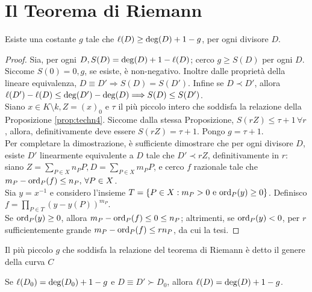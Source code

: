     \section{Il Teorema di Riemann}
        \begin{teorema}[di Riemann]
            Esiste una costante $g$ tale che $\ell(D) \geq \deg(D) + 1 - g$, per 
            ogni divisore $D$.
        \end{teorema}
        \begin{proof}
            Sia, per ogni $D, S(D) = \deg(D) + 1 - \ell(D)$; cerco $g \geq S(D)$ 
            per ogni $D$. \\
            Siccome $S(0) = 0, g$, se esiste, è non-negativo. Inoltre dalle 
            proprietà della lineare equivalenza, $D \equiv D' \Longrightarrow 
            S(D) = S(D')$. Infine se $D \prec D'$, allora $\ell(D') - \ell(D) \leq 
            \deg(D') - \deg(D) \Longrightarrow S(D) \leq S(D')$.\\
            Siano $x \in K \setminus k, Z =(x)_0$ e $\tau$ il più piccolo 
            intero che soddisfa la relazione della Proposizione 
            \ref{prop:techn4}. Siccome dalla stessa Proposizione, $S(rZ) \leq 
            \tau + 1 \, \forall r$, allora, definitivamente deve essere $S(rZ) 
            = \tau + 1$. Pongo $g = \tau + 1$. \\
            Per completare la dimostrazione, è sufficiente dimostrare che per 
            ogni divisore $D$, esiste $D'$ linearmente equivalente a $D$ tale 
            che $D' \prec rZ$, definitivamente in $r$: siano $Z = 
            \sum_{P \in X} n_PP, D = \sum_{P \in X} m_PP$, e cerco $f$ 
            razionale tale che $m_P - \text{ord}_P(f) \leq n_P, \, \forall P \in X$.
            \\ Sia $y = x^{-1}$ e considero l'insieme $T = \{P \in X : m_P > 0 
            \text{ e } \text{ord}_P(y) \geq 0\}$. Definisco $f = \prod_{P \in T} 
            (y - y(P))^{m_P}$. \\
            Se $\text{ord}_P(y) \geq 0$, allora $m_P - \text{ord}_P(f) \leq 0 \leq n_P$; 
            altrimenti, se $\text{ord}_P(y) < 0$, per $r$ sufficientemente grande 
            $m_P - \text{ord}_P(f) \leq rn_P$, da cui la tesi.
        \end{proof}
        \begin{definizione}
            Il più piccolo $g$ che soddisfa la relazione del teorema di 
            Riemann è detto il genere della curva $C$
        \end{definizione}
        \begin{corollario}
            Se $\ell(D_0) = \deg(D_0) + 1 - g$ e $D \equiv D' \succ D_0$, allora 
            $\ell(D) = \deg(D) + 1 - g$.
        \end{corollario}
